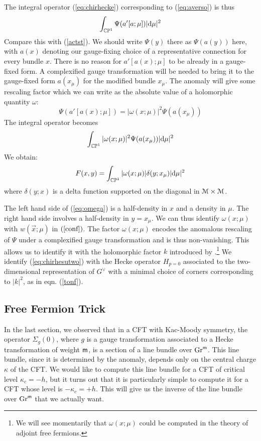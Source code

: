 \documentclass[11pt,a4paper]{article}
\begin{document}
The integral operator (\ref{eq:chirhecke}) corresponding to (\ref{eq:averso}) is thus 
 \begin{equation}\label{eq:chirhesutwo}
\int_{{\mathbb{CP}}^1}\Psi(a'[a;\mu])|\mathrm d \mu|^2
 \end{equation}
 Compare this with (\ref{actst}). We should write $\Psi(y)$ there as $\Psi(a(y))$ here, with $a(x)$ denoting our gauge-fixing 
 choice of a representative connection for every bundle $x$. There is no reason for $a'[a(x);\mu]$ 
 to be already in a gauge-fixed form. A complexified gauge transformation will be needed to bring it to the gauge-fixed form $a(x_\mu)$ for the modified bundle $x_\mu$. The anomaly will give some rescaling factor which we can write as the absolute value of a holomorphic quantity $\omega$:
  \begin{equation} \label{eq:omega}
\Psi(a'[a(x);\mu]) = |\omega(x;\mu)|^2 \Psi(a(x_\mu))
 \end{equation} 
 The integral operator becomes 
  \begin{equation}
\int_{{\mathbb{CP}}^1}|\omega(x;\mu)|^2 \Psi(a(x_\mu))|\mathrm d \mu|^2
 \end{equation}
We obtain:
  \begin{equation}
F(x,y) = \int_{{\mathbb{CP}}^1} |\omega(x;\mu)|\delta(y;x_\mu)|\mathrm d \mu|^2
 \end{equation}
where $\delta(y;x)$ is a delta function supported on the diagonal in ${\mathcal M} \times {\mathcal M}$. 

 The left hand side of (\ref{eq:omega}) is a half-density 
 in $x$ and a density in $\mu$. The right hand side involves a half-density in $y=x_\mu$. 
 We can thus identify $\omega(x;\mu)$ with $w(\vec x;\mu)$ in $(\ref{conf})$. 
The factor $\omega(x;\mu)$  encodes the anomalous rescaling of $\Psi$ under a complexified gauge transformation
and is thus non-vanishing. This allows us to identify it with the holomorphic factor $k$ introduced by \cite{BD}.\footnote{We will see momentarily that $\omega(x;\mu)$ could be computed in the theory of adjoint free fermions.} We identify (\ref{eq:chirhesutwo}) with the Hecke operator $H_{p=0}$ associated to the two-dimensional representation of $G^\vee$ with a minimal choice of corners corresponding to $|k|^2$, as in eqn. (\ref{tonf}).


\subsection{Free Fermion Trick}\label{fft}

In the last section, we observed that in a CFT with Kac-Moody symmetry, the operator $\Sigma_g(0)$, where $g$ is a gauge transformation associated to a Hecke transformation of weight
${\sf m}$, is a section of a line bundle over ${\mathrm{Gr}}^{\sf m}$.   This line bundle, since it is determined by the anomaly, depends only on the central charge $\kappa$ of the CFT.   
We would like to compute this line bundle for a CFT of critical level $\kappa_c=-h$, but it turns out that it is particularly simple to compute it for a CFT
whose level is $-\kappa_c=+h$.  This will give us the inverse of the line bundle over ${\mathrm{Gr}}^{\sf m}$ that we actually want.
 
\end{document}
